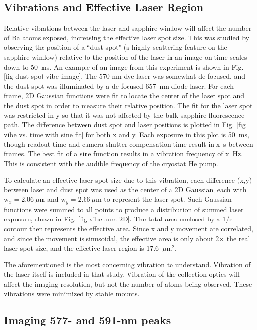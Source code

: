 \subsection{Vibrations and Effective Laser Region}

Relative vibrations between the laser and sapphire window will affect the number of Ba atoms exposed, increasing the effective laser spot size.  This was studied by observing the position of a ``dust spot" (a highly scattering feature on the sapphire window) relative to the position of the laser in an image on time scales down to 50~ms.  An example of an image from this experiment is shown in Fig. [fig dust spot vibe image].  The 570-nm dye laser was somewhat de-focused, and the dust spot was illuminated by a de-focused 657~nm diode laser. For each frame, 2D Gaussian functions were fit to locate the center of the laser spot and the dust spot in order to measure their relative position.  The fit for the laser spot was restricted in y so that it was not affected by the bulk sapphire fluorescence path.  The difference between dust spot and laser positions is plotted in Fig. [fig vibe vs. time with sine fit] for both x and y.  Each exposure in this plot is 50~ms, though readout time and camera shutter compensation time result in x~s between frames.  The best fit of a sine function results in a vibration frequency of x~Hz.  This is consistent with the audible frequency of the cryostat He pump.

To calculate an effective laser spot size due to this vibration, each difference (x,y) between laser and dust spot was used as the center of a 2D Gaussian, each with w$_{x} = 2.06~\mu$m and w$_{y} = 2.66~\mu$m to represent the laser spot.  Such Gaussian functions were summed to all points to produce a distribution of summed laser exposure, shown in Fig. [fig vibe sum 2D].  The total area enclosed by a 1/e contour then represents the effective area.  Since x and y movement are correlated, and since the movement is sinusoidal, the effective area is only about 2$\times$ the real laser spot size, and the effective laser region is {\color{red}17.6}~$\mu$m$^{2}$.

The aforementioned is the most concerning vibration to understand.  Vibration of the laser itself is included in that study.  Vibration of the collection optics will affect the imaging resolution, but not the number of atoms being observed.  These vibrations were minimized by stable mounts.

\subsection{Imaging 577- and 591-nm peaks}

